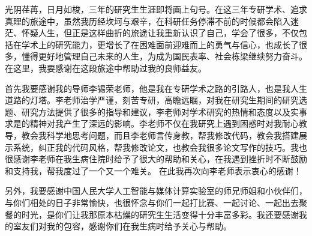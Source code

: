 \begin{acknowledge}%
    光阴荏苒，日月如梭，三年的研究生生涯即将画上句号。在这三年专研学术、追求真理的旅途中，虽然我历经坎坷与艰辛，在科研任务停滞不前的时候都会陷入迷茫、怀疑人生，但正是这样曲折的旅途让我重新认识了自己，学会了很多，不仅包括在学术上的研究能力，更增长了在困难面前迎难而上的勇气与信心，也成长了很多，懂得更好地管理自己未来的人生，为成为国民表率、社会栋梁继续努力奋斗。在这里，我要感谢在这段旅途中帮助过我的良师益友。

    首先我要感谢我的导师李锡荣老师，他是我在专研学术之路的引路人，也是我人生道路的灯塔。李老师治学严谨，刻苦专研，高瞻远瞩，对我在研究生期间的研究选题、研究方法提供了很多的指导和建议，李老师对学术研究的热情和态度以及实事求是的精神对我产生了深远的影响。李老师不仅在我研究上遇到困惑时对我耐心教导，教会我科学地思考问题，而且李老师言传身教，帮我修改代码，教会我搭建展示系统，纠正我的代码风格，帮我修改论文，也教会我很多论文写作的技巧。我也很感谢李老师在我生病住院时给予了很大的帮助和关心，在我遇到挫折时不断鼓励和支持我，帮我度过了一个又一个难关。
    在此我再次向李老师表示衷心的感谢！

    另外，我要感谢中国人民大学人工智能与媒体计算实验室的师兄师姐和小伙伴们，与你们相处的日子非常愉快，也很怀念与你们一起打比赛、一起讨论、一起出去聚餐的时光，是你们让我那原本枯燥的研究生生活变得十分丰富多彩。我还要感谢我的室友们对我的包容，感谢你们在我生病时给予关心与帮助。
\end{acknowledge}

